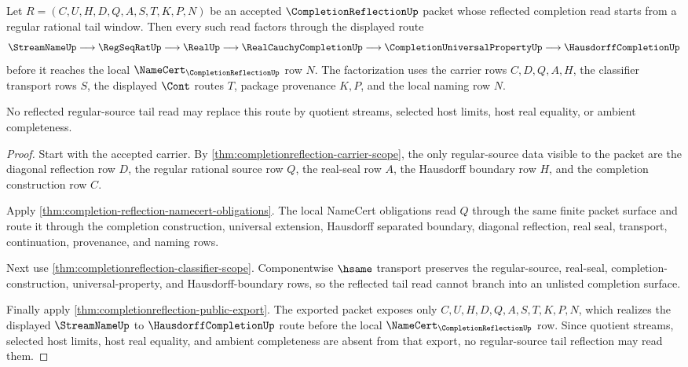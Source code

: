 \begin{theorem}
\label{thm:completionreflection-regular-source-tail-reflection}
Let $R=(C,U,H,D,Q,A,S,T,K,P,N)$ be an accepted $\CompletionReflectionUp$ packet whose reflected completion read starts from a regular rational tail window. Then every such read factors through the displayed route
$$
\StreamNameUp \longrightarrow \RegSeqRatUp \longrightarrow \RealUp \longrightarrow \RealCauchyCompletionUp \longrightarrow \CompletionUniversalPropertyUp \longrightarrow \HausdorffCompletionUp
$$
before it reaches the local $\NameCert_{\CompletionReflectionUp}$ row $N$. The factorization uses the carrier rows $C,D,Q,A,H$, the classifier transport rows $S$, the displayed $\Cont$ routes $T$, package provenance $K,P$, and the local naming row $N$.

No reflected regular-source tail read may replace this route by quotient streams, selected host limits, host real equality, or ambient completeness.
\end{theorem}
\begin{proof}
Start with the accepted carrier. By \autoref{thm:completionreflection-carrier-scope}, the only regular-source data visible to the packet are the diagonal reflection row $D$, the regular rational source row $Q$, the real-seal row $A$, the Hausdorff boundary row $H$, and the completion construction row $C$.

Apply \autoref{thm:completion-reflection-namecert-obligations}. The local NameCert obligations read $Q$ through the same finite packet surface and route it through the completion construction, universal extension, Hausdorff separated boundary, diagonal reflection, real seal, transport, continuation, provenance, and naming rows.

Next use \autoref{thm:completionreflection-classifier-scope}. Componentwise $\hsame$ transport preserves the regular-source, real-seal, completion-construction, universal-property, and Hausdorff-boundary rows, so the reflected tail read cannot branch into an unlisted completion surface.

Finally apply \autoref{thm:completionreflection-public-export}. The exported packet exposes only $C,U,H,D,Q,A,S,T,K,P,N$, which realizes the displayed $\StreamNameUp$ to $\HausdorffCompletionUp$ route before the local $\NameCert_{\CompletionReflectionUp}$ row. Since quotient streams, selected host limits, host real equality, and ambient completeness are absent from that export, no regular-source tail reflection may read them.
\end{proof}

